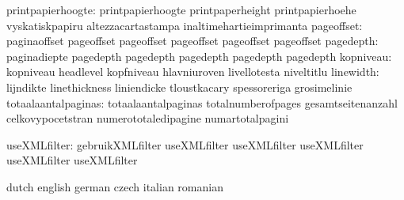                printpapierhoogte: printpapierhoogte                printpaperheight
                                  printpapierhoehe                 vyskatiskpapiru
                                  altezzacartastampa               inaltimehartieimprimanta  %
                      pageoffset: paginaoffset                     pageoffset
                                  pageoffset                       pageoffset
                                  pageoffset                       pageoffset
                       pagedepth: paginadiepte                     pagedepth 
                                  pagedepth                        pagedepth 
                                  pagedepth                        pagedepth                        
                       kopniveau: kopniveau                        headlevel
                                  kopfniveau                       hlavniuroven
                                  livellotesta                     niveltitlu %
                       linewidth: lijndikte                        linethickness
                                  liniendicke                      tloustkacary
                                  spessoreriga                     grosimelinie
             totaalaantalpaginas: totaalaantalpaginas              totalnumberofpages
                                  gesamtseitenanzahl               celkovypocetstran
                                  numerototaledipagine             numartotalpagini

                    useXMLfilter: gebruikXMLfilter                 useXMLfilter
                                  useXMLfilter                     useXMLfilter
                                  useXMLfilter                     useXMLfilter

\stopcommands




\startcommands                    dutch                            english
                                  german                           czech
                                  italian                          romanian

